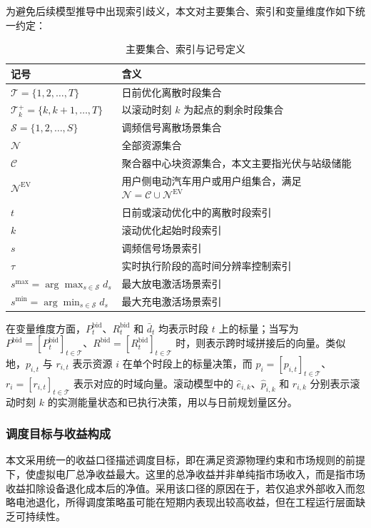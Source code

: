 为避免后续模型推导中出现索引歧义，本文对主要集合、索引和变量维度作如下统一约定：
\begin{table}[htbp]
\centering
\caption{主要集合、索引与记号定义}
\label{tab:vpp_admm_symbols}
\begin{tabular}{ll}
\hline
记号 & 含义 \\
\hline
$\mathcal{T}=\{1,2,\ldots,T\}$ & 日前优化离散时段集合 \\
$\mathcal{T}_k^{+}=\{k,k+1,\ldots,T\}$ & 以滚动时刻 $k$ 为起点的剩余时段集合 \\
$\mathcal{S}=\{1,2,\ldots,S\}$ & 调频信号离散场景集合 \\
$\mathcal{N}$ & 全部资源集合 \\
$\mathcal{C}$ & 聚合器中心块资源集合，本文主要指光伏与站级储能 \\
$\mathcal{N}^{\mathrm{EV}}$ & 用户侧电动汽车用户或用户组集合，满足 $\mathcal{N}=\mathcal{C}\cup\mathcal{N}^{\mathrm{EV}}$ \\
$t$ & 日前或滚动优化中的离散时段索引 \\
$k$ & 滚动优化起始时段索引 \\
$s$ & 调频信号场景索引 \\
$\tau$ & 实时执行阶段的高时间分辨率控制索引 \\
$s^{\max}=\arg\max_{s\in\mathcal{S}} d_s$ & 最大放电激活场景索引 \\
$s^{\min}=\arg\min_{s\in\mathcal{S}} d_s$ & 最大充电激活场景索引 \\
\hline
\end{tabular}
\end{table}

在变量维度方面，$P_t^{\mathrm{bid}}$、$R_t^{\mathrm{bid}}$ 和 $\bar d_t$ 均表示时段 $t$ 上的标量；当写为 $P^{\mathrm{bid}}=[P_t^{\mathrm{bid}}]_{t\in\mathcal{T}}$、$R^{\mathrm{bid}}=[R_t^{\mathrm{bid}}]_{t\in\mathcal{T}}$ 时，则表示跨时域拼接后的向量。类似地，$p_{i,t}$ 与 $r_{i,t}$ 表示资源 $i$ 在单个时段上的标量决策，而 $p_i=[p_{i,t}]_{t\in\mathcal{T}}$、$r_i=[r_{i,t}]_{t\in\mathcal{T}}$ 表示对应的时域向量。滚动模型中的 $\hat e_{i,k}$、$\hat p_{i,k}$ 和 $\hat r_{i,k}$ 分别表示滚动时刻 $k$ 的实测能量状态和已执行决策，用以与日前规划量区分。

\subsubsection{调度目标与收益构成}
\label{subsubsec:vpp_admm_model_two_stage_profit}

本文采用统一的收益口径描述调度目标，即在满足资源物理约束和市场规则的前提下，使虚拟电厂总净收益最大。这里的总净收益并非单纯指市场收入，而是指市场收益扣除设备退化成本后的净值。采用该口径的原因在于，若仅追求外部收入而忽略电池退化，所得调度策略虽可能在短期内表现出较高收益，但在工程运行层面缺乏可持续性。

